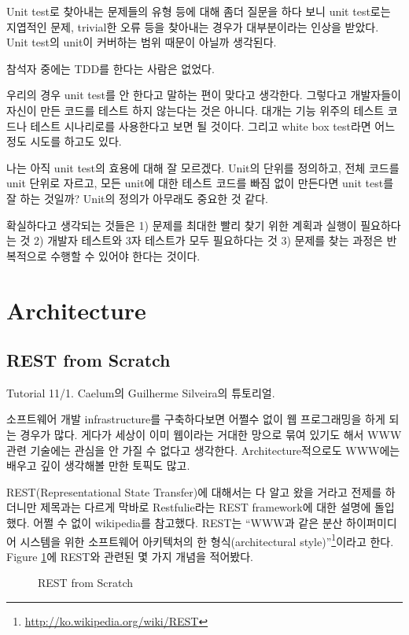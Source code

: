 \documentclass[11pt]{article}
\begin{document}
Unit test로 찾아내는 문제들의 유형 등에 대해 좀더 질문을 하다 보니 
unit test로는 지엽적인 문제, trivial한 오류 등을 찾아내는 경우가 
대부분이라는 인상을 받았다. Unit test의 unit이 커버하는 범위 때문이 
아닐까 생각된다.

참석자 중에는 TDD를 한다는 사람은 없었다. 

우리의 경우 unit test를 안 한다고 말하는 편이 맞다고 생각한다.
그렇다고 개발자들이 자신이 만든 코드를 테스트 하지 않는다는 것은 아니다.
대개는 기능 위주의 테스트 코드나 테스트 시나리로를 사용한다고 보면 
될 것이다. 그리고 white box test라면 어느 정도 시도를 하고도 있다.

나는 아직 unit test의 효용에 대해 잘 모르겠다. Unit의 단위를 정의하고,
전체 코드를 unit 단위로 자르고, 모든 unit에 대한 테스트 코드를 빠짐 없이
만든다면 unit test를 잘 하는 것일까? Unit의 정의가 아무래도 중요한 것 같다.

확실하다고 생각되는 것들은 1) 문제를 최대한 빨리 찾기 위한 계획과 실행이 
필요하다는 것 2) 개발자 테스트와 3자 테스트가 모두 필요하다는 것
3) 문제를 찾는 과정은 반복적으로 수행할 수 있어야 한다는 것이다.

\section{Architecture}

\subsection{REST from Scratch}

Tutorial 11/1. Caelum의 Guilherme Silveira의 튜토리얼.

소프트웨어 개발 infrastructure를 구축하다보면 어쩔수 없이 웹 프로그래밍을 
하게 되는 경우가 많다. 게다가 세상이 이미 웹이라는 거대한 망으로 묶여 있기도 
해서 WWW 관련 기술에는 관심을 안 가질 수 없다고 생각한다. Architecture적으로도
WWW에는 배우고 깊이 생각해볼 만한 토픽도 많고.

REST(Representational State Transfer)에 대해서는 다 알고 왔을 거라고 전제를 
하더니만 제목과는 다르게 막바로 Restfulie\cite{restfulie}라는 REST 
framework에 대한 설명에 돌입했다. 어쩔 수 없이 wikipedia를 참고했다. 
REST는 ``WWW과 같은 분산 하이퍼미디어 시스템을 위한 소프트웨어 아키텍처의 한 
형식(architectural style)''\footnote{\url{http://ko.wikipedia.org/wiki/REST}}이라고 한다. Figure \ref{REST}에 REST와 관련된 몇 가지 개념을 적어봤다.

\begin{figure}[t]
    \begin{Frame}
        \begin{center}
        \end{center}
    \end{Frame}
    \caption{REST from Scratch}
    \label{REST}
\end{figure}
\end{document}
